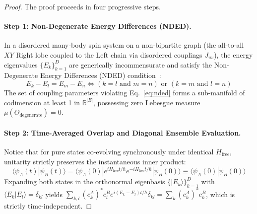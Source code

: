 \documentclass[10pt,twocolumn,3p]{article}
\begin{document}
\begin{proof}
The proof proceeds in four progressive steps.

\paragraph{Step 1: Non-Degenerate Energy Differences (NDED).}
In a disordered many-body spin system on a non-bipartite graph (the all-to-all $XY$ Right lobe coupled to the Left chain via disordered couplings $J_{uv}$), the energy eigenvalues $\{E_k\}_{k=1}^D$ are generically incommensurate and satisfy the Non-Degenerate Energy Differences (NDED) condition~\cite{short2011}:
\begin{equation}
    E_k - E_l = E_m - E_n \iff (k = l \text{ and } m = n) \text{ or } (k = m \text{ and } l = n)
    \label{eq:nded}
\end{equation}
The set of coupling parameters violating Eq.~\eqref{eq:nded} forms a sub-manifold of codimension at least 1 in $\mathbb{R}^{|E|}$, possessing zero Lebesgue measure $\mu(\Theta_{\text{degenerate}}) = 0$.

\paragraph{Step 2: Time-Averaged Overlap and Diagonal Ensemble Evaluation.}
Notice that for pure states co-evolving synchronously under identical $H_{\text{free}}$, unitarity strictly preserves the instantaneous inner product:
\begin{equation}
    \langle \psi_A(t) | \psi_B(t) \rangle = \langle \psi_A(0) | e^{i H_{\text{free}} t / \hbar} e^{-i H_{\text{free}} t / \hbar} | \psi_B(0) \rangle \equiv \langle \psi_A(0) | \psi_B(0) \rangle
\end{equation}
Expanding both states in the orthonormal eigenbasis $\{|E_k\rangle\}_{k=1}^D$ with $\langle E_k | E_l \rangle = \delta_{kl}$ yields $\sum_{k,l} (c_k^A)^* c_l^B e^{i(E_k - E_l)t/\hbar} \delta_{kl} = \sum_k (c_k^A)^* c_k^B$, which is strictly time-independent.


\end{proof}
\end{document}
